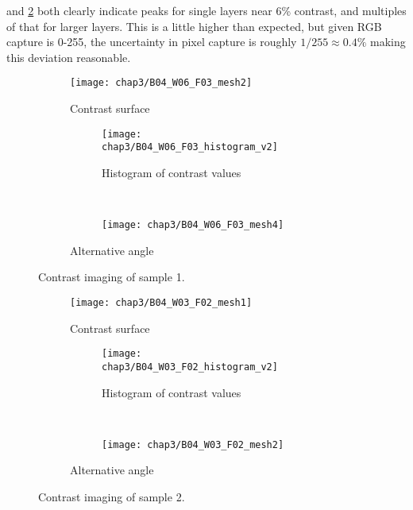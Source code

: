 \documentclass[../Matt_Gebert_Honours_Thesis.tex]{subfiles}
\begin{document}
 and \cref{fig:contrast2} both clearly indicate peaks for single layers near 6\% contrast, and multiples of that for larger layers. This is a little higher than expected, but given RGB capture is 0-255, the uncertainty in pixel capture is roughly $1/255 \approx 0.4\%$ making this deviation reasonable.
\begin{figure}[H]
	\centering
	\begin{subfigure}[b]{0.6\textwidth}
		\texttt{[image: chap3/B04\_W06\_F03\_mesh2]}
		\caption{Contrast surface}
	\end{subfigure}
	\begin{subfigure}[b]{0.35\textwidth}
		\centering
		\begin{subfigure}{\textwidth}
			\texttt{[image: chap3/B04\_W06\_F03\_histogram\_v2]}
			\caption{Histogram of contrast values}
		\end{subfigure}\\
		\begin{subfigure}{\textwidth}
			\centering
			\texttt{[image: chap3/B04\_W06\_F03\_mesh4]}
		\end{subfigure}
		\caption{Alternative angle}
	\end{subfigure}
	\caption[Contrast imaging sample 1]{Contrast imaging of sample 1.}\label{fig:contrast1}
\end{figure}
\begin{figure}[H]
	\centering
	\begin{subfigure}[b]{0.6\textwidth}
		\texttt{[image: chap3/B04\_W03\_F02\_mesh1]}
		\caption{Contrast surface}
	\end{subfigure}
	\begin{subfigure}[b]{0.35\textwidth}
		\centering
		\begin{subfigure}{\textwidth}
			\texttt{[image: chap3/B04\_W03\_F02\_histogram\_v2]}
			\caption{Histogram of contrast values}
		\end{subfigure}\\
		\begin{subfigure}{\textwidth}
			\centering
			\texttt{[image: chap3/B04\_W03\_F02\_mesh2]}
		\end{subfigure}
		\caption{Alternative angle}
	\end{subfigure}
	\caption[Contrast imaging sample 2]{Contrast imaging of sample 2.}\label{fig:contrast2}
\end{figure}
\end{document}
